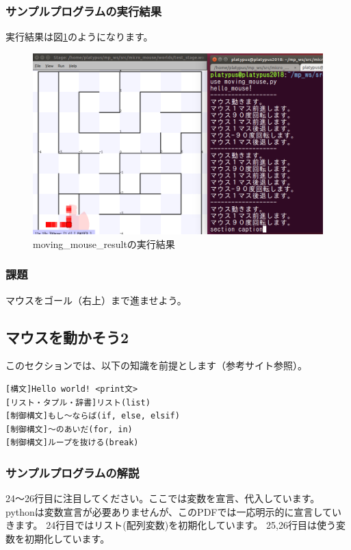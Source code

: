 \documentclass[11pt,a4paper]{jsarticle}
\begin{document}
\subsubsection{サンプルプログラムの実行結果}
実行結果は図\ref{moving_mouse_result}のようになります。
\begin{figure}[h]
  \begin{center}
    \includegraphics[width=128mm]{./moving_mouse_result.png}
  \end{center}
  \label{moving_mouse_result}
  \caption{moving\_mouse\_resultの実行結果}
\end{figure}

\subsubsection{課題}
マウスをゴール（右上）まで進ませよう。


\newpage
\subsection{マウスを動かそう2}
このセクションでは、以下の知識を前提とします（参考サイト参照）。
\begin{lstlisting}[frame=single]
[構文]Hello world! <print文>
[リスト・タプル・辞書]リスト(list)
[制御構文]もし～ならば(if, else, elsif)
[制御構文]～のあいだ(for, in)
[制御構文]ループを抜ける(break)
\end{lstlisting}

\subsubsection{サンプルプログラムの解説}
24〜26行目に注目してください。ここでは変数を宣言、代入しています。
pythonは変数宣言が必要ありませんが、このPDFでは一応明示的に宣言していきます。
24行目ではリスト(配列変数)を初期化しています。
25,26行目は使う変数を初期化しています。
\end{document}
